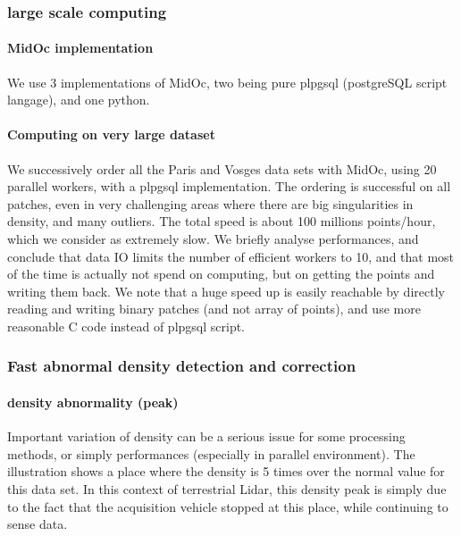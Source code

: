		\subsubsection{large scale computing}
		
			\paragraph{MidOc implementation} 
				We use 3 implementations of MidOc, two being pure plpgsql (postgreSQL script langage), and one python.
			\paragraph{Computing on very large dataset}
				We successively order all the Paris and Vosges data sets with MidOc, using 20 parallel workers, with a plpgsql implementation.
				The ordering is successful on all patches, even in very challenging areas where there are big singularities in density, and many outliers.
				The total speed is about 100 millions points/hour, which we consider as extremely slow.
				We briefly analyse performances, and conclude that data IO limits the number of efficient workers to 10, and that most of the time is actually not spend on computing, but on getting the points and writing them back.
				We note that a huge speed up is easily reachable by directly reading and writing binary patches (and not array of points), and use more reasonable C code instead of plpgsql script.
		\subsubsection{Fast abnormal density detection and correction}
			
			
			\paragraph{density abnormality (peak)}
				Important variation of density can be a serious issue for some processing methods, or simply performances (especially in parallel environment). 
				The illustration shows a place where the density is 5 times over the normal value for this data set.
				In this context of terrestrial Lidar, this density peak is simply due to the fact that the acquisition vehicle stopped at this place, while continuing to sense data.
